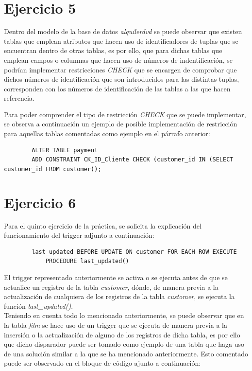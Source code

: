 \documentclass[11pt]{report}
\begin{document}
	\section{Ejercicio 5}
	Dentro del modelo de la base de datos \emph{alquilerdvd} se puede observar que existen tablas que emplean atributos que hacen uso de identificadores de tuplas que se encuentran dentro de otras tablas, es por ello, que para dichas tablas que emplean campos o columnas que hacen uso de  números de indentificación, se podrían implementar restricciones \emph{CHECK} que se encargen de comprobar que dichos números de identificación que son introducidos para las distintas tuplas,  corresponden con los números de identificación de las tablas a las que hacen referencia.

	Para poder comprender el tipo de restricción \emph{CHECK} que se puede implementar, se observa a continuación un ejemplo de posible implementación de restricción para aquellas tablas comentadas como ejemplo en el párrafo anterior:

	\begin{verbatim}
		ALTER TABLE payment
		ADD CONSTRAINT CK_ID_Cliente CHECK (customer_id IN (SELECT customer_id FROM customer));
	\end{verbatim}

	\section{Ejercicio 6}
	Para el quinto ejercicio de la práctica, se solicita la explicación del funcionamiento del trigger adjunto a continuación:

	\begin{verbatim}
		last_updated BEFORE UPDATE ON customer FOR EACH ROW EXECUTE
			PROCEDURE last_updated()
	\end{verbatim}

	El trigger representado anteriormente se activa o se ejecuta antes de que se actualice un registro de la tabla \emph{customer}, dónde, de manera previa a la actualización de cualquiera de los registros de la tabla \emph{customer}, se ejecuta la función \emph{last\_updated()}.
\\
	Teniendo en cuenta todo lo mencionado anteriormente, se puede observar que en la tabla \emph{film} se hace uso de un trigger que se ejecuta de manera previa a la insersión o la actualización de alguno de los registros de dicha tabla, es por ello que dicho disparador puede ser tomado como ejemplo de una tabla que haga uso de una solución similar a la que se ha mencionado anteriormente. Esto comentado puede ser observado en el bloque de código ajunto a continuación:
\end{document}
